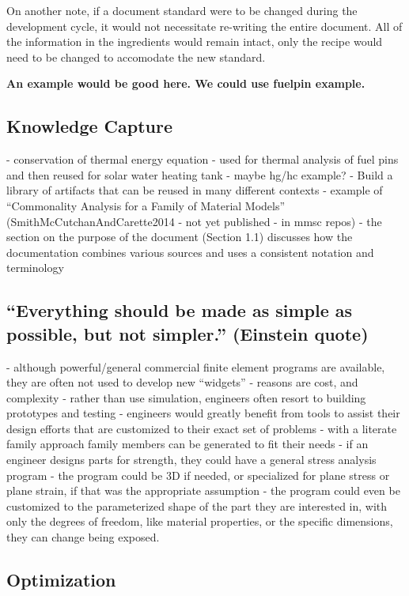 \documentclass[10pt, preprint]{sigplanconf}
\begin{document}
On another note, if a document standard were to be changed during the 
development cycle, it would not necessitate re-writing the entire document. All
 of the information in the ingredients would remain intact, only the recipe 
 would need to be changed to accomodate the new standard.

\textbf{An example would be good here.  We could use fuelpin example.}

\subsection{Knowledge Capture} \label{subsec:knowledge}

- conservation of thermal energy equation - used for thermal analysis of fuel
pins and then reused for solar water heating tank - maybe hg/hc example?  -
Build a library of artifacts that can be reused in many different contexts -
example of “Commonality Analysis for a Family of Material Models”
(SmithMcCutchanAndCarette2014 - not yet published - in mmsc repos) - the section
on the purpose of the document (Section 1.1) discusses how the documentation
combines various sources and uses a consistent notation and terminology

\subsection{``Everything should be made as simple as possible, but not
  simpler.'' (Einstein quote)}  \label{subsec:everything}

- although powerful/general commercial finite element programs are available,
they are often not used to develop new “widgets” - reasons are cost, and
complexity - rather than use simulation, engineers often resort to building
prototypes and testing - engineers would greatly benefit from tools to assist
their design efforts that are customized to their exact set of problems - with a
literate family approach family members can be generated to fit their needs - if
an engineer designs parts for strength, they could have a general stress
analysis program - the program could be 3D if needed, or specialized for plane
stress or plane strain, if that was the appropriate assumption - the program
could even be customized to the parameterized shape of the part they are
interested in, with only the degrees of freedom, like material properties, or
the specific dimensions, they can change being exposed.

\subsection{Optimization} \label{subsec:optimization}
\end{document}
